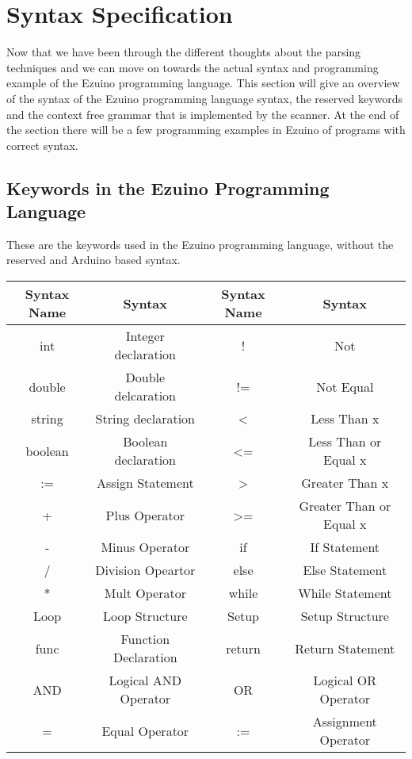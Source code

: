 \section{Syntax Specification}
Now that we have been through the different thoughts about the parsing techniques and we can move on towards the actual syntax and programming example of the Ezuino programming language.
This section will give an overview of the syntax of the Ezuino programming language syntax, the reserved keywords and the context free grammar that is implemented by the scanner. At the end of the section there will be a few programming examples in Ezuino of programs with correct syntax.
\subsection{Keywords in the Ezuino Programming Language}
These are the keywords used in the Ezuino programming language, without the reserved and Arduino based syntax.
\begin{table}[H]
\begin{tabular}{|c|c|c|c|}
\hline
\textbf{Syntax Name} & \textbf{Syntax}      & \textbf{Syntax Name} & \textbf{Syntax}         \\ \hline
int                  & Integer declaration  & !                    & Not                     \\ \hline
double               & Double delcaration   & !=                   & Not Equal               \\ \hline
string               & String declaration   & \textless{}          & Less Than x             \\ \hline
boolean              & Boolean declaration  & \textless{}=         & Less Than or Equal x    \\ \hline
:=                   & Assign Statement     & \textgreater{}       & Greater Than x          \\ \hline
+                    & Plus Operator        & \textgreater{}=      & Greater Than or Equal x \\ \hline
-                    & Minus Operator       & if                   & If Statement            \\ \hline
/                    & Division Opeartor    & else                 & Else Statement          \\ \hline
*                    & Mult Operator        & while                & While Statement         \\ \hline
Loop                 & Loop Structure       & Setup                & Setup Structure         \\ \hline
func                 & Function Declaration & return               & Return Statement        \\ \hline
AND                  & Logical AND Operator & OR                   & Logical OR Operator     \\ \hline
=                    & Equal Operator       & :=                   & Assignment Operator    \\ \hline


\end{tabular}
\end{table}
